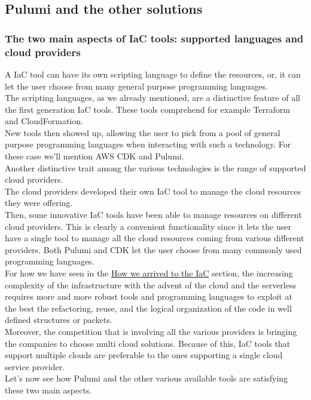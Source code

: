 \subsection{Pulumi and the other solutions}

\subsubsection{The two main aspects of IaC tools: supported languages and cloud providers}
A IaC tool can have its own scripting language to define the resources, or, it can let the user choose from many general purpose programming languages.\\
The scripting languages, as we already mentioned, are a distinctive feature of all the first generation IaC tools.
These tools comprehend for example Terraform and CloudFormation.\\
New tools then showed up, allowing the user to pick from a pool of general purpose programming languages when interacting with such a technology.
For these case we'll mention AWS CDK and Pulumi.\\

Another distinctive trait among the various technologies is the range of supported cloud providers.\\
The cloud providers developed their own IaC tool to manage the cloud resources they were offering.\\
Then, some innovative IaC tools have been able to manage resources on different cloud providers.
This is clearly a convenient functionality since it lets the user have a single tool to manage all the cloud resources coming from various different providers.
Both Pulumi and CDK let the user choose from many commonly used programming languages.\\

For how we have seen in the \hyperref[sec:story-iac]{How we arrived to the IaC} section, the increasing complexity of the infrastructure with the advent of the cloud and the serverless requires more and more robust tools and programming languages to exploit at the best the refactoring, reuse, and the logical organization of the code in well defined structures or packets.\\
Moreover, the competition that is involving all the various providers is bringing the companies to choose multi cloud solutions. Because of this, IaC tools that support multiple clouds are preferable to the ones supporting a single cloud service provider.\\
Let's now see how Pulumi and the other various available tools are satisfying these two main aspects.

